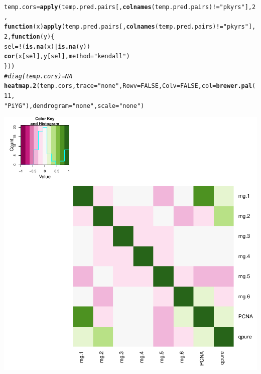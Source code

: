 \documentclass{article}\usepackage[]{graphicx}\usepackage[]{color}
\makeatletter
\def\maxwidth{ %
  \ifdim\Gin@nat@width>\linewidth
    \linewidth
  \else
    \Gin@nat@width
  \fi
}
\newcommand{\hlnum}[1]{\textcolor[rgb]{0.686,0.059,0.569}{#1}}%
\newcommand{\hlstr}[1]{\textcolor[rgb]{0.192,0.494,0.8}{#1}}%
\newcommand{\hlcom}[1]{\textcolor[rgb]{0.678,0.584,0.686}{\textit{#1}}}%
\newcommand{\hlopt}[1]{\textcolor[rgb]{0,0,0}{#1}}%
\newcommand{\hlstd}[1]{\textcolor[rgb]{0.345,0.345,0.345}{#1}}%
\newcommand{\hlkwa}[1]{\textcolor[rgb]{0.161,0.373,0.58}{\textbf{#1}}}%
\newcommand{\hlkwb}[1]{\textcolor[rgb]{0.69,0.353,0.396}{#1}}%
\newcommand{\hlkwc}[1]{\textcolor[rgb]{0.333,0.667,0.333}{#1}}%
\newcommand{\hlkwd}[1]{\textcolor[rgb]{0.737,0.353,0.396}{\textbf{#1}}}%
\newenvironment{kframe}{%
 \def\at@end@of@kframe{}%
 \ifinner\ifhmode%
  \def\at@end@of@kframe{\end{minipage}}%
  \begin{minipage}{\columnwidth}%
 \fi\fi%
 \def\FrameCommand##1{\hskip\@totalleftmargin \hskip-\fboxsep
 \colorbox{shadecolor}{##1}\hskip-\fboxsep
     \hskip-\linewidth \hskip-\@totalleftmargin \hskip\columnwidth}%
 \MakeFramed {\advance\hsize-\width
   \@totalleftmargin\z@ \linewidth\hsize
   \@setminipage}}%
 {\par\unskip\endMakeFramed%
 \at@end@of@kframe}
\newenvironment{knitrout}{}{} %
\makeatother
\begin{document}
\begin{knitrout}
{}


\begin{kframe}\begin{alltt}
\hlstd{temp.cors} \hlkwb{=} \hlkwd{apply}\hlstd{(temp.pred.pairs[,} \hlkwd{colnames}\hlstd{(temp.pred.pairs)} \hlopt{!=} \hlstr{"pkyrs"}\hlstd{],} \hlnum{2}\hlstd{,}
    \hlkwa{function}\hlstd{(}\hlkwc{x}\hlstd{)} \hlkwd{apply}\hlstd{(temp.pred.pairs[,} \hlkwd{colnames}\hlstd{(temp.pred.pairs)} \hlopt{!=} \hlstr{"pkyrs"}\hlstd{],}
        \hlnum{2}\hlstd{,} \hlkwa{function}\hlstd{(}\hlkwc{y}\hlstd{) \{}
            \hlstd{sel} \hlkwb{=} \hlopt{!}\hlstd{(}\hlkwd{is.na}\hlstd{(x)} \hlopt{|} \hlkwd{is.na}\hlstd{(y))}
            \hlkwd{cor}\hlstd{(x[sel], y[sel],} \hlkwc{method} \hlstd{=} \hlstr{"kendall"}\hlstd{)}
        \hlstd{\}))}
\hlcom{# diag(temp.cors) = NA}
\hlkwd{heatmap.2}\hlstd{(temp.cors,} \hlkwc{trace} \hlstd{=} \hlstr{"none"}\hlstd{,} \hlkwc{Rowv} \hlstd{=} \hlnum{FALSE}\hlstd{,} \hlkwc{Colv} \hlstd{=} \hlnum{FALSE}\hlstd{,} \hlkwc{col} \hlstd{=} \hlkwd{brewer.pal}\hlstd{(}\hlnum{11}\hlstd{,}
    \hlstr{"PiYG"}\hlstd{),} \hlkwc{dendrogram} \hlstd{=} \hlstr{"none"}\hlstd{,} \hlkwc{scale} \hlstd{=} \hlstr{"none"}\hlstd{)}
\end{alltt}
\end{kframe}

{\centering \includegraphics[width=\maxwidth]{figure/metagene-pairs-6} 

}
\end{knitrout}
\end{document}
